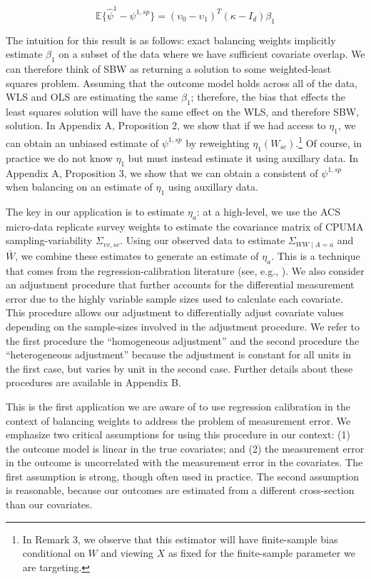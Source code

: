 \documentclass[article]{imsart}
\theoremstyle{plain}
\theoremstyle{remark}
\begin{document}
\begin{equation}
\mathbb{E}\{\hat{\psi}^{1} - \psi^{1, sp}\} = (\upsilon_0 - \upsilon_1)^T(\kappa - I_d)\beta_1
\end{equation}

The intuition for this result is as follows: exact balancing weights implicitly estimate $\beta_1$ on a subset of the data where we have sufficient covariate overlap. We can therefore think of SBW as returning a solution to some weighted-least squares problem. Assuming that the outcome model holds across all of the data, WLS and OLS are estimating the same $\beta_1$; therefore, the bias that effects the least squares solution will have the same effect on the WLS, and therefore SBW, solution. In Appendix A, Proposition 2, we show that if we had access to $\eta_1$, we can obtain an unbiased estimate of $\psi^{1, sp}$ by reweighting $\eta_1(W_{sc})$.\footnote{In Remark 3, we observe that this estimator will have finite-sample bias conditional on $W$ and viewing $X$ as fixed for the finite-sample parameter we are targeting.} Of course, in practice we do not know $\eta_1$ but must instead estimate it using auxillary data. In Appendix A, Proposition 3, we show that we can obtain a consistent of $\psi^{1, sp}$ when balancing on an estimate of $\eta_1$ using auxillary data. 

The key in our application is to estimate $\eta_a$: at a high-level, we use the ACS micro-data replicate survey weights to estimate the covariance matrix of CPUMA sampling-variability $\Sigma_{vv, sc}$. Using our observed data to estimate $\Sigma_{WW \mid A = a}$ and $\bar{W}$, we combine these estimates to generate an estimate of $\eta_a$. This is a technique that comes from the regression-calibration literature (see, e.g., \cite{gleser1992importance}). We also consider an adjustment procedure that further accounts for the differential measurement error due to the highly variable sample sizes used to calculate each covariate. This procedure allows our adjustment to differentially adjust covariate values depending on the sample-sizes involved in the adjustment procedure. We refer to the first procedure the ``homogeneous adjustment'' and the second procedure the ``heterogeneous adjustment'' because the adjustment is constant for all units in the first case, but varies by unit in the second case. Further details about these procedures are available in Appendix B.

This is the first application we are aware of to use regression calibration in the context of balancing weights to address the problem of measurement error. We emphasize two critical assumptions for using this procedure in our context: (1) the outcome model is linear in the true covariates; and (2) the measurement error in the outcome is uncorrelated with the measurement error in the covariates. The first assumption is strong, though often used in practice. The second assumption is reasonable, because our outcomes are estimated from a different cross-section than our covariates. 
\end{document}
